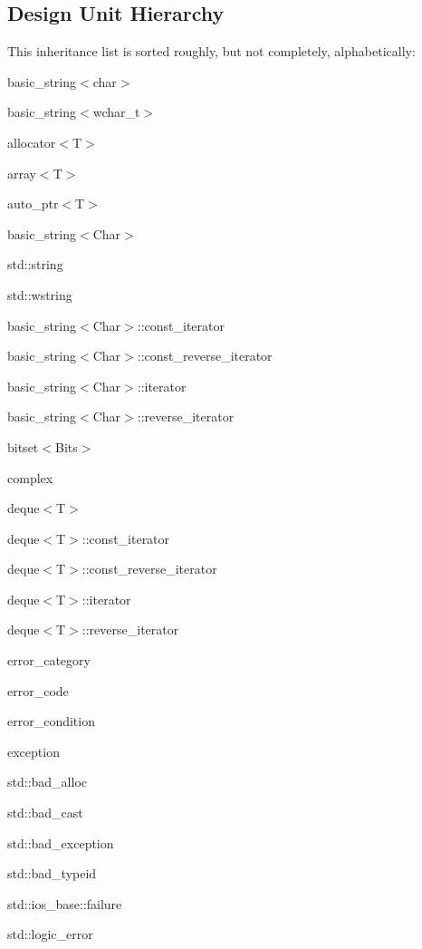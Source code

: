 \subsection{Design Unit Hierarchy}
This inheritance list is sorted roughly, but not completely, alphabetically\+:\begin{DoxyCompactList}
\item basic\+\_\+string$<$char$>$\item basic\+\_\+string$<$wchar\+\_\+t$>$\item allocator$<$T$>$\item array$<$T$>$\item auto\+\_\+ptr$<$T$>$\item basic\+\_\+string$<$Char$>$\begin{DoxyCompactList}
\item std\+:\+:string\item std\+:\+:wstring\end{DoxyCompactList}
\item basic\+\_\+string$<$Char$>$\+:\+:const\+\_\+iterator\item basic\+\_\+string$<$Char$>$\+:\+:const\+\_\+reverse\+\_\+iterator\item basic\+\_\+string$<$Char$>$\+:\+:iterator\item basic\+\_\+string$<$Char$>$\+:\+:reverse\+\_\+iterator\item bitset$<$Bits$>$\item complex\item deque$<$T$>$\item deque$<$T$>$\+:\+:const\+\_\+iterator\item deque$<$T$>$\+:\+:const\+\_\+reverse\+\_\+iterator\item deque$<$T$>$\+:\+:iterator\item deque$<$T$>$\+:\+:reverse\+\_\+iterator\item error\+\_\+category\item error\+\_\+code\item error\+\_\+condition\item exception\begin{DoxyCompactList}
\item std\+:\+:bad\+\_\+alloc\item std\+:\+:bad\+\_\+cast\item std\+:\+:bad\+\_\+exception\item std\+:\+:bad\+\_\+typeid\item std\+:\+:ios\+\_\+base\+:\+:failure\item std\+:\+:logic\+\_\+error\begin{DoxyCompactList}

\end{DoxyCompactList}
\end{DoxyCompactList}
\end{DoxyCompactList}
